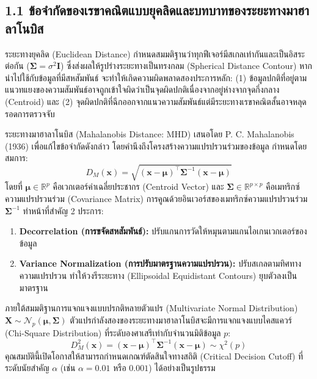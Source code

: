 \documentclass[12pt,a4paper]{article}
\begin{document}
\subsection*{1.1 ข้อจำกัดของเรขาคณิตแบบยุคลิดและบทบาทของระยะทางมาฮาลาโนบิส}
ระยะทางยุคลิด (Euclidean Distance) กำหนดสมมติฐานว่าทุกฟีเจอร์มีสเกลเท่ากันและเป็นอิสระต่อกัน ($\mathbf{\Sigma} = \sigma^2 \mathbf{I}$) ซึ่งส่งผลให้รูปร่างระยะทางเป็นทรงกลม (Spherical Distance Contour) หากนำไปใช้กับข้อมูลที่มีสหสัมพันธ์ จะทำให้เกิดความผิดพลาดสองประการหลัก: (1) ข้อมูลปกติที่อยู่ตามแนวทแยงของความสัมพันธ์อาจถูกเข้าใจผิดว่าเป็นจุดผิดปกติเนื่องจากอยู่ห่างจากจุดกึ่งกลาง (Centroid) และ (2) จุดผิดปกติที่ฉีกออกจากแนวความสัมพันธ์แต่มีระยะทางเรขาคณิตสั้นอาจหลุดรอดการตรวจจับ

ระยะทางมาฮาลาโนบิส (Mahalanobis Distance: MHD) เสนอโดย P. C. Mahalanobis (1936) เพื่อแก้ไขข้อจำกัดดังกล่าว โดยคำนึงถึงโครงสร้างความแปรปรวนร่วมของข้อมูล กำหนดโดยสมการ:
\begin{equation}
D_M(\mathbf{x}) = \sqrt{(\mathbf{x} - \boldsymbol{\mu})^\top \mathbf{\Sigma}^{-1} (\mathbf{x} - \boldsymbol{\mu})}
\end{equation}
โดยที่ $\boldsymbol{\mu} \in \mathbb{R}^p$ คือเวกเตอร์ค่าเฉลี่ยประชากร (Centroid Vector) และ $\mathbf{\Sigma} \in \mathbb{R}^{p \times p}$ คือเมทริกซ์ความแปรปรวนร่วม (Covariance Matrix) การคูณด้วยอินเวอร์สของเมทริกซ์ความแปรปรวนร่วม $\mathbf{\Sigma}^{-1}$ ทำหน้าที่สำคัญ 2 ประการ:
\begin{enumerate}[leftmargin=1.8em, itemsep=0pt, topsep=1pt]
    \item \textbf{Decorrelation (การขจัดสหสัมพันธ์):} ปรับแกนการวัดให้หมุนตามแกนไอเกนเวกเตอร์ของข้อมูล
    \item \textbf{Variance Normalization (การปรับมาตรฐานความแปรปรวน):} ปรับสเกลตามทิศทางความแปรปรวน ทำให้วงรีระยะทาง (Ellipsoidal Equidistant Contours) ยุบตัวลงเป็นมาตรฐาน
\end{enumerate}

ภายใต้สมมติฐานการแจกแจงแบบปรกติหลายตัวแปร (Multivariate Normal Distribution) $\mathbf{X} \sim \mathcal{N}_p(\boldsymbol{\mu}, \mathbf{\Sigma})$ ตัวแปรกำลังสองของระยะทางมาฮาลาโนบิสจะมีการแจกแจงแบบไคสแควร์ (Chi-Square Distribution) ที่ระดับองศาเสรีเท่ากับจำนวนมิติข้อมูล $p$:
\begin{equation}
D_M^2(\mathbf{x}) = (\mathbf{x} - \boldsymbol{\mu})^\top \mathbf{\Sigma}^{-1} (\mathbf{x} - \boldsymbol{\mu}) \sim \chi^2(p)
\end{equation}
คุณสมบัตินี้เปิดโอกาสให้สามารถกำหนดเกณฑ์ตัดสินใจทางสถิติ (Critical Decision Cutoff) ที่ระดับนัยสำคัญ $\alpha$ (เช่น $\alpha = 0.01$ หรือ $0.001$) ได้อย่างเป็นรูปธรรม
\end{document}
